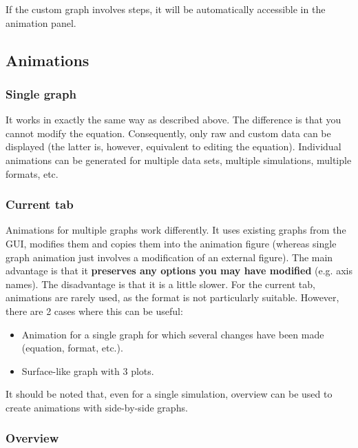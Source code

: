 \documentclass{article}
\begin{document}
If the custom graph involves steps, it will be automatically accessible in the animation panel.

\subsection{Animations}

\subsubsection{Single graph}

It works in exactly the same way as described above. The difference is that you cannot modify the equation. Consequently, only raw and custom data can be displayed (the latter is, however, equivalent to editing the equation). Individual animations can be generated for multiple data sets, multiple simulations, multiple formats, etc.

\subsubsection{Current tab}

Animations for multiple graphs work differently. It uses existing graphs from the GUI, modifies them and copies them into the animation figure (whereas single graph animation just involves a modification of an external figure). The main advantage is that it \textbf{preserves any options you may have modified} (e.g. axis names). The disadvantage is that it is a little slower. For the current tab, animations are rarely used, as the format is not particularly suitable. However, there are 2 cases where this can be useful:

\begin{itemize}
    \item Animation for a single graph for which several changes have been made (equation, format, etc.).
    \item Surface-like graph with 3 plots.
\end{itemize}

It should be noted that, even for a single simulation, overview can be used to create animations with side-by-side graphs.

\subsubsection{Overview}
\end{document}
